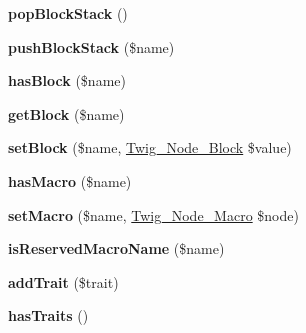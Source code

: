 \begin{DoxyCompactItemize}
\item 
{\bfseries pop\+Block\+Stack} ()\hypertarget{class_twig___parser_a530c1e50ce33798359120714a799f14f}{}\label{class_twig___parser_a530c1e50ce33798359120714a799f14f}

\item 
{\bfseries push\+Block\+Stack} (\$name)\hypertarget{class_twig___parser_a20b3dae4ef5bc44a48cc8b4f077dc5be}{}\label{class_twig___parser_a20b3dae4ef5bc44a48cc8b4f077dc5be}

\item 
{\bfseries has\+Block} (\$name)\hypertarget{class_twig___parser_ade38e8b97bc678e012017eaec7594585}{}\label{class_twig___parser_ade38e8b97bc678e012017eaec7594585}

\item 
{\bfseries get\+Block} (\$name)\hypertarget{class_twig___parser_a4c2f3ed0733b1d16c6b9d1d13898574f}{}\label{class_twig___parser_a4c2f3ed0733b1d16c6b9d1d13898574f}

\item 
{\bfseries set\+Block} (\$name, \hyperlink{class_twig___node___block}{Twig\+\_\+\+Node\+\_\+\+Block} \$value)\hypertarget{class_twig___parser_a09f53c68be0c2cc0d11472667c714367}{}\label{class_twig___parser_a09f53c68be0c2cc0d11472667c714367}

\item 
{\bfseries has\+Macro} (\$name)\hypertarget{class_twig___parser_a4745b963bc3fbb604343ebf1e68088b8}{}\label{class_twig___parser_a4745b963bc3fbb604343ebf1e68088b8}

\item 
{\bfseries set\+Macro} (\$name, \hyperlink{class_twig___node___macro}{Twig\+\_\+\+Node\+\_\+\+Macro} \$node)\hypertarget{class_twig___parser_aa78fc6cb476b91da99f607355bc983ce}{}\label{class_twig___parser_aa78fc6cb476b91da99f607355bc983ce}

\item 
{\bfseries is\+Reserved\+Macro\+Name} (\$name)\hypertarget{class_twig___parser_a0c795261c005fc1b53b78a9cdd9cae25}{}\label{class_twig___parser_a0c795261c005fc1b53b78a9cdd9cae25}

\item 
{\bfseries add\+Trait} (\$trait)\hypertarget{class_twig___parser_a232cb22c4f3dc89dc727567021036770}{}\label{class_twig___parser_a232cb22c4f3dc89dc727567021036770}

\item 
{\bfseries has\+Traits} ()\hypertarget{class_twig___parser_ad52a88405ecca93c8a0bea73b0539348}{}\label{class_twig___parser_ad52a88405ecca93c8a0bea73b0539348}


\end{DoxyCompactItemize}
